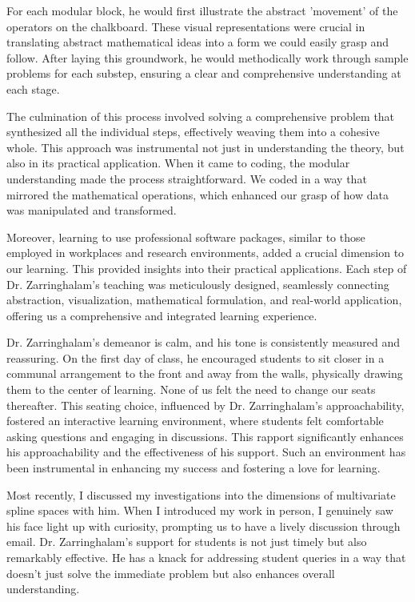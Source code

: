 \documentclass[11pt,a4paper,roman]{moderncv}
\begin{document}
\vspace{0.5cm}
For each modular block, he would first illustrate the abstract 'movement' of the operators on the chalkboard. These visual representations were crucial in translating abstract mathematical ideas into a form we could easily grasp and follow. After laying this groundwork, he would methodically work through sample problems for each substep, ensuring a clear and comprehensive understanding at each stage.

\vspace{0.5cm}
The culmination of this process involved solving a comprehensive problem that synthesized all the individual steps, effectively weaving them into a cohesive whole. This approach was instrumental not just in understanding the theory, but also in its practical application. When it came to coding, the modular understanding made the process straightforward. We coded in a way that mirrored the mathematical operations, which enhanced our grasp of how data was manipulated and transformed.

\vspace{0.5cm}
Moreover, learning to use professional software packages, similar to those employed in workplaces and research environments, added a crucial dimension to our learning. This provided insights into their practical applications. Each step of Dr. Zarringhalam's teaching was meticulously designed, seamlessly connecting abstraction, visualization, mathematical formulation, and real-world application, offering us a comprehensive and integrated learning experience.

\vspace{0.5cm}
Dr. Zarringhalam's demeanor is calm, and his tone is consistently measured and reassuring. On the first day of class, he encouraged students to sit closer in a communal arrangement to the front and away from the walls, physically drawing them to the center of learning. None of us felt the need to change our seats thereafter. This seating choice, influenced by Dr. Zarringhalam's approachability, fostered an interactive learning environment, where students felt comfortable asking questions and engaging in discussions. This rapport significantly enhances his approachability and the effectiveness of his support. Such an environment has been instrumental in enhancing my success and fostering a love for learning.

\vspace{0.5cm}
Most recently, I discussed my investigations into the dimensions of multivariate spline spaces with him. When I introduced my work in person, I genuinely saw his face light up with curiosity, prompting us to have a lively discussion through email.
\vspace{0.5cm}
Dr. Zarringhalam's support for students is not just timely but also remarkably effective. He has a knack for addressing student queries in a way that doesn't just solve the immediate problem but also enhances overall understanding.
\end{document}
